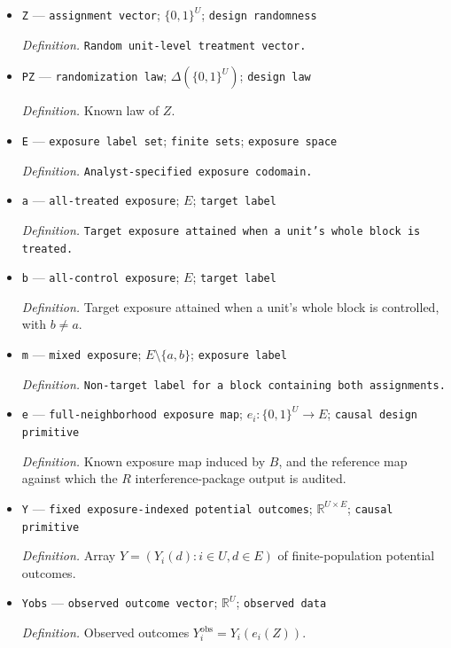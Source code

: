 \documentclass{article}
\begin{document}
\begin{itemize}
  \item \texttt{Z} --- \texttt{assignment vector}; \(\{0,1\}^U\); \texttt{design randomness}
  \par\smallskip\noindent\emph{Definition.} \texttt{Random unit-\allowbreak{}level treatment vector.}
  \item \texttt{PZ} --- \texttt{randomization law}; \(\Delta(\{0,1\}^U)\); \texttt{design law}
  \par\smallskip\noindent\emph{Definition.} Known law of \(Z\).
  \item \texttt{E} --- \texttt{exposure label set}; \texttt{finite sets}; \texttt{exposure space}
  \par\smallskip\noindent\emph{Definition.} \texttt{Analyst-\allowbreak{}specified exposure codomain.}
  \item \texttt{a} --- \texttt{all-\allowbreak{}treated exposure}; \(E\); \texttt{target label}
  \par\smallskip\noindent\emph{Definition.} \texttt{Target exposure attained when a unit's whole block is treated.}
  \item \texttt{b} --- \texttt{all-\allowbreak{}control exposure}; \(E\); \texttt{target label}
  \par\smallskip\noindent\emph{Definition.} Target exposure attained when a unit's whole block is controlled, with \(b\ne a\).
  \item \texttt{m} --- \texttt{mixed exposure}; \(E\setminus\{a,b\}\); \texttt{exposure label}
  \par\smallskip\noindent\emph{Definition.} \texttt{Non-\allowbreak{}target label for a block containing both assignments.}
  \item \texttt{e} --- \texttt{full-\allowbreak{}neighborhood exposure map}; \(e_i:\{0,1\}^U\to E\); \texttt{causal design primitive}
  \par\smallskip\noindent\emph{Definition.} Known exposure map induced by \(B\), and the reference map against which the \(R\) interference-package output is audited.
  \item \texttt{Y} --- \texttt{fixed exposure-\allowbreak{}indexed potential outcomes}; \(\mathbb R^{U\times E}\); \texttt{causal primitive}
  \par\smallskip\noindent\emph{Definition.} Array \(Y=(Y_i(d):i\in U,d\in E)\) of finite-population potential outcomes.
  \item \texttt{Yobs} --- \texttt{observed outcome vector}; \(\mathbb R^U\); \texttt{observed data}
  \par\smallskip\noindent\emph{Definition.} Observed outcomes \(Y_i^{\mathrm{obs}}=Y_i(e_i(Z))\).

\end{itemize}
\end{document}
